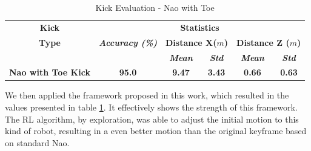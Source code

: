 \begin{table}[!htbp]
	\caption{Kick Evaluation - Nao with Toe}
	\begin{center} 
		\begin{tabular}{|c|c|c|c|c|c|}
			\hline
			\textbf{Kick}&\multicolumn{5}{|c|}{\textbf{Statistics}} \\
			\cline{2-6} 
			\textbf{Type} & \textbf{\textit{Accuracy (\%)}}& \multicolumn{2}{|c|}{\textbf{Distance X(\(m\))}}& 
			\multicolumn{2}{|c|}{\textbf{Distance Z (\(m\))}}\\
			\cline {3-6} 
			& & \textbf{\textit{Mean}}& \textbf{\textit{Std}}
			& \textbf{\textit{Mean}}& \textbf{\textit{Std}}\\
			\hline
			\textbf{Nao with Toe Kick} & \textbf{95.0} & \textbf {9.47} & \textbf{3.43} & \textbf{0.66} & \textbf{0.63} \\ 
			\hline
		\end{tabular}
		\label{tab:naotoe}
	\end{center}
\end{table}

We then applied the framework proposed in this work, which resulted in the values presented in table \ref{tab:naotoe}. It effectively shows the strength of this framework. The RL algorithm, by exploration, was able to adjust the initial motion to this kind of robot, resulting in a even better motion than the original keyframe based on standard Nao. 